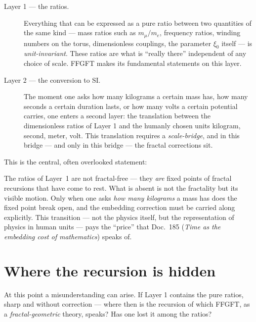\begin{description}
  \item[Layer 1 --- the ratios.] Everything that can be expressed as a
    pure ratio between two quantities of the same kind --- mass ratios
    such as $m_{\mu}/m_{e}$, frequency ratios, winding numbers on the
    torus, dimensionless couplings, the parameter $\xi_{0}$ itself ---
    is \emph{unit-invariant}. These ratios are what is ``really there''
    independent of any choice of scale. FFGFT makes its fundamental
    statements on this layer.

  \item[Layer 2 --- the conversion to SI.] The moment one asks how many
    kilograms a certain mass has, how many seconds a certain duration
    lasts, or how many volts a certain potential carries, one enters a
    second layer: the translation between the dimensionless ratios of
    Layer 1 and the humanly chosen units kilogram, second, meter, volt.
    This translation requires a \emph{scale-bridge}, and in this bridge
    --- and only in this bridge --- the fractal corrections sit.
\end{description}

This is the central, often overlooked statement:

\begin{center}
\end{center}

The ratios of Layer~1 are not fractal-free --- they \emph{are} fixed
points of fractal recursions that have come to rest. What is absent is
not the fractality but its visible motion. Only when one asks
\emph{how many kilograms} a mass has does the fixed point break open,
and the embedding correction must be carried along explicitly. This
transition --- not the physics itself, but the representation of
physics in human units --- pays the ``price'' that Doc.~185
(\emph{Time as the embedding cost of mathematics}) speaks of.

\section{Where the recursion is hidden}

At this point a misunderstanding can arise. If Layer 1 contains the
pure ratios, sharp and without correction --- where then is the
recursion of which FFGFT, as a \emph{fractal-geometric} theory, speaks?
Has one lost it among the ratios?

